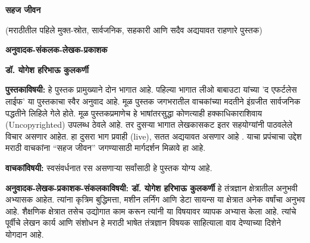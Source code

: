 \documentclass{article}
\begin{document}
\thispagestyle{empty}
\null\vfill

\begin{center}
{\fontsize{64}{78}\selectfont\color{titleorange}\textbf{सहज जीवन}}

\vspace{1em}

{\fontsize{10}{14}\selectfont\color{subtitleblue}(मराठीतील पहिले मुक्त-स्रोत, सार्वजनिक, सहकारी आणि सदैव अद्ययावत राहणारे पुस्तक)}

\vspace{10em}

{\fontsize{12}{14}\selectfont\color{authorgreen}\textbf{अनुवादक-संकलक-लेखक-प्रकाशक}}

\vspace{1em}

{\fontsize{24}{20}\selectfont\color{authorgreen}\textbf{डॉ. योगेश हरिभाऊ कुलकर्णी}}
\end{center}

\vfill\null
\clearpage

\thispagestyle{empty}
\vspace*{0.5in}

\noindent\textbf{पुस्तकाविषयी:} हे पुस्तक प्रामुख्याने दोन भागात आहे.  पहिल्या भागात लीओ बाबाउटा यांच्या 'द एफर्टलेस लाईफ' या पुस्तकाचा स्वैर अनुवाद आहे.  मूळ पुस्तक जगभरातील वाचकांच्या मदतीने इंग्रजीत सार्वजनिक पद्धतीने लिहिले गेले होते.  मूळ पुस्तकप्रमाणेच  हे भाषांतरसुद्धा  कोणत्याही हक्काधिकाराशिवाय (Uncopyrighted) उपलब्ध ठेवले आहे.  तर दुसऱ्या भागात लेखकासकट इतर सहयोग्यांनी पाठवलेले विचार असणार आहेत.  हा दुसरा भाग प्रवाही (live), सतत अद्ययावत असणार आहे .  याचा प्रपंचाचा उद्देश मराठी वाचकांना ``सहज जीवन'' जगण्यासाठी मार्गदर्शन मिळावे हा आहे. 

\vspace{1.5em}

\noindent\textbf{वाचकांविषयी:} स्वसंवर्धनात रस असणाऱ्या सर्वांसाठी हे पुस्तक योग्य आहे.

\vspace{1.5em}

\noindent\textbf{अनुवादक-लेखक-प्रकाशक-संकलकाविषयी: डॉ. योगेश हरिभाऊ कुलकर्णी} हे तंत्रज्ञान क्षेत्रातील अनुभवी अभ्यासक आहेत. त्यांना कृत्रिम बुद्धिमत्ता, मशीन लर्निंग आणि डेटा सायन्स या क्षेत्रात अनेक वर्षांचा अनुभव आहे. शैक्षणिक क्षेत्रात तसेच उद्योगात काम करून त्यांनी या विषयावर व्यापक अभ्यास केला आहे. त्यांचे पूर्वीचे लेखन कार्य आणि संशोधन हे मराठी भाषेत तंत्रज्ञान विषयक साहित्याला वाव देण्याच्या दिशेने योगदान आहे.
\end{document}
